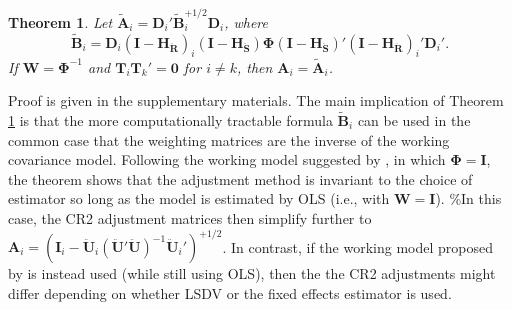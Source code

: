 \documentclass[12pt]{article}
\newtheorem{thm}{Theorem}
\begin{document}
\begin{thm}
\label{thm:absorb}
Let $\mathbf{\tilde{A}}_i = \mathbf{D}_i'\mathbf{\tilde{B}}_i^{+1/2} \mathbf{D}_i$, where 
\begin{equation}
\label{eq:CR2_B_tilde}
\mathbf{\tilde{B}}_i = \mathbf{D}_i\left(\mathbf{I} - \mathbf{H_{\ddot{R}}}\right)_i \left(\mathbf{I} - \mathbf{H_{\ddot{S}}}\right) \boldsymbol\Phi \left(\mathbf{I} - \mathbf{H_{\ddot{S}}}\right)' \left(\mathbf{I} - \mathbf{H_{\ddot{R}}}\right)_i' \mathbf{D}_i'.
\end{equation}
If $\mathbf{W} = \boldsymbol\Phi^{-1}$ and $\mathbf{T}_i \mathbf{T}_k' = \mathbf{0}$ for $i \neq k$, then $\mathbf{A}_i = \mathbf{\tilde{A}}_i$. 
\end{thm}

Proof is given in the supplementary materials. The main implication of
Theorem \ref{thm:absorb} is that the more computationally tractable
formula \(\mathbf{\tilde{B}}_i\) can be used in the common case that the
weighting matrices are the inverse of the working covariance model.
Following the working model suggested by \citet{Bell2002bias}, in which
\(\boldsymbol\Phi = \mathbf{I}\), the theorem shows that the adjustment
method is invariant to the choice of estimator so long as the model is
estimated by OLS (i.e., with \(\mathbf{W} = \mathbf{I}\)). \%In this
case, the CR2 adjustment matrices then simplify further to
\(\mathbf{A}_i = \left(\mathbf{I}_i - \mathbf{\ddot{U}}_i\left(\mathbf{\ddot{U}}'\mathbf{\ddot{U}}\right)^{-1}\mathbf{\ddot{U}}_i'\right)^{+1/2}\).
In contrast, if the working model proposed by \citet{Imbens2015robust}
is instead used (while still using OLS), then the the CR2 adjustments
might differ depending on whether LSDV or the fixed effects estimator is
used.

\newpage



\end{document}
